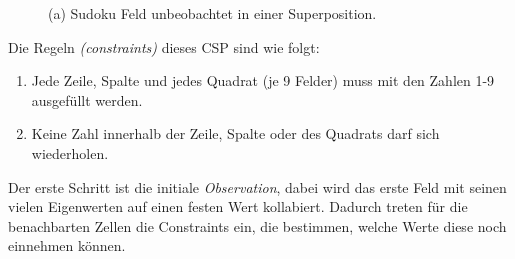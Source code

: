 \documentclass[12pt, a4paper,twoside,openright]{report} %
\begin{document}
\begin{figure}[H]
    \centering
    \caption{(a) Sudoku Feld unbeobachtet in einer Superposition.}%
\end{figure}

Die Regeln \textit{(constraints)} dieses CSP sind wie folgt:
\begin{enumerate}
    \item Jede Zeile, Spalte und jedes Quadrat {(je 9 Felder)} muss mit den Zahlen 1-9 ausgefüllt werden.
    \item Keine Zahl innerhalb der Zeile, Spalte oder des Quadrats darf sich wiederholen.
\end{enumerate}

Der erste Schritt ist die initiale \textit{Observation}, dabei wird das erste Feld mit seinen vielen Eigenwerten auf einen festen Wert kollabiert.
Dadurch treten für die benachbarten Zellen die Constraints ein, die bestimmen, welche Werte diese noch einnehmen können.
\end{document}
